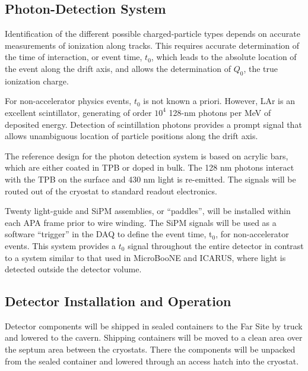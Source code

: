 \subsection{Photon-Detection System}

Identification of the different possible charged-particle types 
depends on accurate measurements of ionization along tracks. This requires accurate determination
of the time of interaction, or event time, $t_0$, which leads to the absolute location 
of the event along the drift axis, and allows the determination of $Q_0$,  the 
true ionization charge.

For non-accelerator physics events, $t_0$ is not known a priori.  
However, LAr is an excellent scintillator, generating of 
order $10^{4}$ 128-nm photons per MeV of deposited energy.  
Detection of scintillation photons 
provides a prompt signal that allows unambiguous 
location of particle positions along the drift axis.

The reference design for the photon detection system is based on acrylic bars, which are either coated in TPB or doped in bulk. The 128 nm photons interact with the TPB on the surface and 430 nm light is re-emitted. 
The signals will be routed out of the cryostat to standard readout electronics.

Twenty light-guide and SiPM assemblies, or ``paddles'', will be installed within each APA frame prior to wire winding. The SiPM signals will be used as a software ``trigger'' in the DAQ to define the event time, t$_0$, for non-accelerator events. This system provides a $t_0$ signal throughout the entire detector in contrast to a system similar to that used in MicroBooNE and ICARUS, where light is detected outside the detector volume. 


\subsection{Detector Installation and Operation}
\label{sec:det-install}

Detector components will be shipped in sealed containers to the Far Site by truck and lowered to the cavern. Shipping containers will be moved to a clean area over the septum area between the cryostats. There the components will be unpacked from the sealed container and lowered  through an access hatch into the cryostat. 

